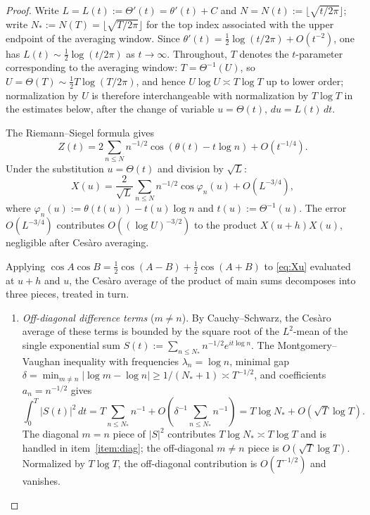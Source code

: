 \documentclass[12pt]{amsart}
\theoremstyle{remark}
\begin{document}
\begin{proof}
Write $L=L(t):=\Theta'(t)=\theta'(t)+C$ and $N=N(t):=\lfloor\sqrt{t/2\pi}\rfloor$;
write $N_*:=N(T)=\lfloor\sqrt{T/2\pi}\rfloor$ for the top index associated
with the upper endpoint of the averaging window.  Since
$\theta'(t)=\tfrac12\log(t/2\pi)+O(t^{-2})$, one has
$L(t)\sim\tfrac12\log(t/2\pi)$ as $t\to\infty$.  Throughout, $T$ denotes
the $t$-parameter corresponding to the averaging window: $T=\Theta^{-1}(U)$,
so $U=\Theta(T)\sim\tfrac12 T\log(T/2\pi)$, and hence $U\log U\asymp T\log T$
up to lower order; normalization by $U$ is therefore interchangeable with
normalization by $T\log T$ in the estimates below, after the change of
variable $u=\Theta(t)$, $du=L(t)\,dt$.

The Riemann--Siegel formula \cite[Ch.~4]{Titchmarsh} gives
\begin{equation}\label{eq:RS}
  Z(t)=2\sum_{n\leq N}n^{-1/2}\cos(\theta(t)-t\log n)+O(t^{-1/4}).
\end{equation}
Under the substitution $u=\Theta(t)$ and division by $\sqrt{L}$:
\begin{equation}\label{eq:Xu}
  X(u)=\frac{2}{\sqrt{L}}\sum_{n\leq N}n^{-1/2}\cos\varphi_n(u)+O(L^{-3/4}),
\end{equation}
where $\varphi_n(u):=\theta(t(u))-t(u)\log n$ and $t(u):=\Theta^{-1}(u)$.
The error $O(L^{-3/4})$ contributes $O((\log U)^{-3/2})$ to the product
$X(u+h)X(u)$, negligible after Ces\`aro averaging.

Applying $\cos A\cos B=\tfrac12\cos(A-B)+\tfrac12\cos(A+B)$ to
\eqref{eq:Xu} evaluated at $u+h$ and $u$, the Ces\`aro average of the
product of main sums decomposes into three pieces, treated in turn.

\begin{enumerate}

\item\label{item:offdiag}
\emph{Off-diagonal difference terms} ($m\neq n$).  By Cauchy--Schwarz,
the Ces\`aro average of these terms is bounded by the square root of
the $L^2$-mean of the single exponential sum
$S(t):=\sum_{n\leq N_*}n^{-1/2}e^{it\log n}$.  The Montgomery--Vaughan
inequality \cite{MV} with frequencies $\lambda_n=\log n$, minimal gap
$\delta=\min_{m\neq n}|\log m-\log n|\geq 1/(N_*+1)\asymp T^{-1/2}$, and
coefficients $a_n=n^{-1/2}$ gives
\[
  \int_0^T|S(t)|^2\,dt
  = T\sum_{n\leq N_*}n^{-1}+O\!\left(\delta^{-1}\sum_{n\leq N_*}n^{-1}\right)
  = T\log N_* + O(\sqrt{T}\log T).
\]
The diagonal $m=n$ piece of $|S|^2$ contributes $T\log N_*\asymp T\log T$
and is handled in item~\ref{item:diag}; the off-diagonal $m\neq n$ piece
is $O(\sqrt{T}\log T)$.  Normalized by $T\log T$, the off-diagonal
contribution is $O(T^{-1/2})$ and vanishes.


\end{enumerate}
\end{proof}
\end{document}
